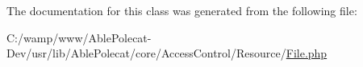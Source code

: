The documentation for this class was generated from the following file\+:\begin{DoxyCompactItemize}
\item 
C\+:/wamp/www/\+Able\+Polecat-\/\+Dev/usr/lib/\+Able\+Polecat/core/\+Access\+Control/\+Resource/\hyperlink{_file_8php}{File.\+php}\end{DoxyCompactItemize}
